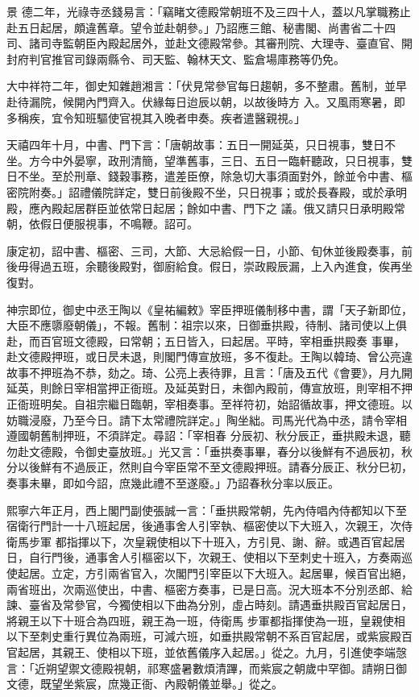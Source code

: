 \begin{pinyinscope}
 景
 德二年，光祿寺丞錢易言：「竊睹文德殿常朝班不及三四十人，蓋以凡掌職務止赴五日起居，頗違舊章。望令並赴朝參。」乃詔應三館、秘書閣、尚書省二十四司、諸司寺監朝臣內殿起居外，並赴文德殿常參。其審刑院、大理寺、臺直官、開封府判官推官司錄兩縣令、司天監、翰林天文、監倉場庫務等仍免。



 大中祥符二年，御史知雜趙湘言：「伏見常參官每日趨朝，多不整肅。舊制，並早赴待漏院，候開內門齊入。伏緣每日迨辰以朝，以故後時方
 入。又風雨寒暑，即多稱疾，宜令知班驅使官視其入晚者申奏。疾者遣醫親視。」



 天禧四年十月，中書、門下言：「唐朝故事：五日一開延英，只日視事，雙日不坐。方今中外晏寧，政刑清簡，望準舊事，三日、五日一臨軒聽政，只日視事，雙日不坐。至於刑章、錢穀事務，遣差臣僚，除急切大事須面對外，餘並令中書、樞密院附奏。」詔禮儀院詳定，雙日前後殿不坐，只日視事；或於長春殿，或於承明殿，應內殿起居群臣並依常日起居；餘如中書、門下之
 議。俄又請只日承明殿常朝，依假日便服視事，不鳴鞭。詔可。



 康定初，詔中書、樞密、三司，大節、大忌給假一日，小節、旬休並後殿奏事，前後毋得過五班，余聽後殿對，御廚給食。假日，崇政殿辰漏，上入內進食，俟再坐復對。



 神宗即位，御史中丞王陶以《皇祐編敕》宰臣押班儀制移中書，謂「天子新即位，大臣不應隳廢朝儀」，不報。舊制：祖宗以來，日御垂拱殿，待制、諸司使以上俱赴，而百官班文德殿，曰常朝；五日皆入，曰起居。平時，宰相垂拱殿奏
 事畢，赴文德殿押班，或日昃未退，則閣門傳宣放班，多不復赴。王陶以韓琦、曾公亮違故事不押班為不恭，劾之。琦、公亮上表待罪，且言：「唐及五代《會要》，月九開延英，則餘日宰相當押正衙班。及延英對日，未御內殿前，傳宣放班，則宰相不押正衙班明矣。自祖宗繼日臨朝，宰相奏事。至祥符初，始詔循故事，押文德班。以妨職浸廢，乃至今日。請下太常禮院詳定。」陶坐絀。司馬光代為中丞，請令宰相遵國朝舊制押班，不須詳定。尋詔：「宰相春
 分辰初、秋分辰正，垂拱殿未退，聽勿赴文德殿，令御史臺放班。」光又言：「垂拱奏事畢，春分以後鮮有不過辰初，秋分以後鮮有不過辰正，然則自今宰臣常不至文德殿押班。請春分辰正、秋分巳初，奏事未畢，即如今詔，庶幾此禮不至遂廢。」乃詔春秋分率以辰正。



 熙寧六年正月，西上閣門副使張誠一言：「垂拱殿常朝，先內侍唱內侍都知以下至宿衛行門計一十八班起居，後通事舍人引宰執、樞密使以下大班入，次親王，次侍衛馬步軍
 都指揮以下，次皇親使相以下十班入，方引見、謝、辭。或遇百官起居日，自行門後，通事舍人引樞密以下，次親王、使相以下至刺史十班入，方奏兩巡使起居。立定，方引兩省官入，次閣門引宰臣以下大班入。起居畢，候百官出絕，兩省班出，次兩巡使出，中書、樞密方奏事，已是日高。況大班本不分別丞郎、給諫、臺省及常參官，今獨使相以下曲為分別，虛占時刻。請遇垂拱殿百官起居日，將親王以下十班合為四班，親王為一班，侍衛馬
 步軍都指揮使為一班，皇親使相以下至刺史重行異位為兩班，可減六班，如垂拱殿常朝不系百官起居，或紫宸殿百官起居，其親王、使相以下班，並依舊儀序入起居。」從之。九月，引進使李端愨言：「近朔望禦文德殿視朝，祁寒盛暑數煩清蹕，而紫宸之朝歲中罕御。請朔日御文德，既望坐紫宸，庶幾正衙、內殿朝儀並舉。」從之。




\end{pinyinscope}
